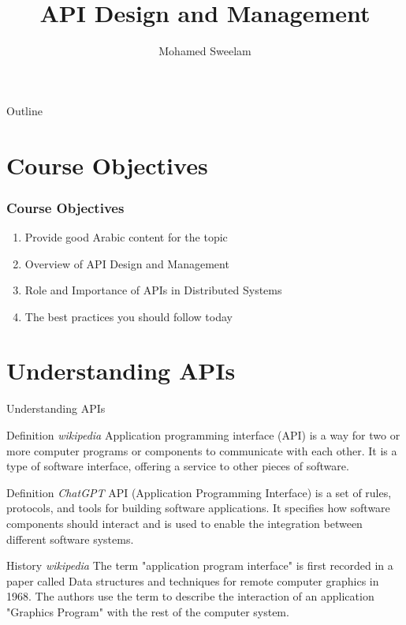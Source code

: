 \documentclass{beamer}
\title{API Design and Management}
\author{Mohamed Sweelam}
\institute{Software Engineer}
\date{}
\begin{document}
\begin{frame}
  \titlepage
\end{frame}

\begin{frame}{Outline}
  \tableofcontents
\end{frame}

\section{Course Objectives}
\begin{frame}
	\frametitle{Course Objectives} %
		\begin{enumerate}
			\item<1-> Provide good Arabic content for the topic
			\item<2-> Overview of API Design and Management
			\item<3-> Role and Importance of APIs in Distributed Systems
			\item<4-> The best practices you should follow today
		\end{enumerate}
\end{frame}

\section{Understanding APIs}
\begin{frame}{Understanding APIs}
	\begin{block}{Definition \tiny{\textit{wikipedia}}}
		\small{ Application programming interface (API) is a way for two or more computer programs or components to communicate with each other. It is a type of software interface, offering a service to other pieces of software.}
	\end{block}
	
	\begin{block}{Definition \tiny{\textit{ChatGPT}}}
		\small{ API (Application Programming Interface) is a set of rules, protocols, and tools for building software applications. It specifies how software components should interact and is used to enable the integration between different software systems. }
	\end{block}
	
	\begin{alertblock}{History \tiny{\textit{wikipedia}}}
		\small{ The term "application program interface" is first recorded in a paper called Data structures and techniques for remote computer graphics in 1968. The authors use the term to describe the interaction of an application "Graphics Program" with the rest of the computer system. }
	\end{alertblock}
  
\end{frame}
\end{document}
